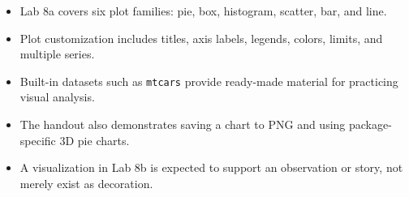 \begin{chapterrecap}
\begin{itemize}
  \item Lab 8a covers six plot families: pie, box, histogram, scatter, bar, and line.
  \item Plot customization includes titles, axis labels, legends, colors, limits, and multiple series.
  \item Built-in datasets such as \texttt{mtcars} provide ready-made material for practicing visual analysis.
  \item The handout also demonstrates saving a chart to PNG and using package-specific 3D pie charts.
  \item A visualization in Lab 8b is expected to support an observation or story, not merely exist as decoration.
\end{itemize}
\end{chapterrecap}
